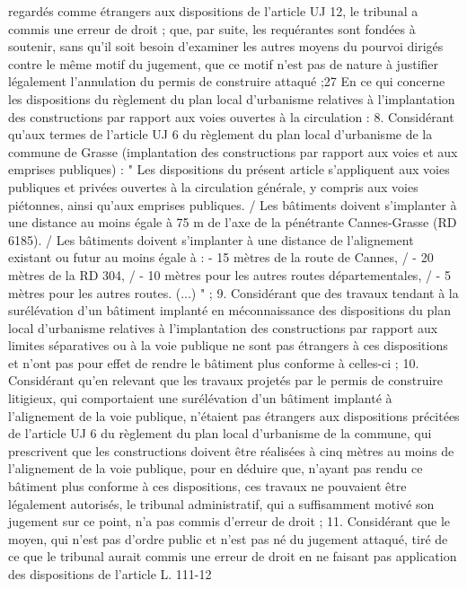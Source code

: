 \documentclass[11pt,a4paper]{report}
\begin{document}
	regardés comme étrangers aux dispositions de l'article UJ 12, le tribunal a commis une erreur de droit ; que,
	par suite, les requérantes sont fondées à soutenir, sans qu'il soit besoin d'examiner les autres moyens du pourvoi
	dirigés contre le même motif du jugement, que ce motif n'est pas de nature à justifier légalement l'annulation du
	permis de construire attaqué ;27
	En ce qui concerne les dispositions du règlement du plan local d'urbanisme relatives à l'implantation des
	constructions par rapport aux voies ouvertes à la circulation :
	8. Considérant qu'aux termes de l'article UJ 6 du règlement du plan local d'urbanisme de la commune de Grasse
	(implantation des constructions par rapport aux voies et aux emprises publiques) : " Les dispositions du présent
	article s'appliquent aux voies publiques et privées ouvertes à la circulation générale, y compris aux voies
	piétonnes, ainsi qu'aux emprises publiques. / Les bâtiments doivent s'implanter à une distance au moins égale à
	75 m de l'axe de la pénétrante Cannes-Grasse (RD 6185). / Les bâtiments doivent s'implanter à une distance de
	l'alignement existant ou futur au moins égale à : - 15 mètres de la route de Cannes, / - 20 mètres de la RD 304, /
	- 10 mètres pour les autres routes départementales, / - 5 mètres pour les autres routes. (...) " ;
	9. Considérant que des travaux tendant à la surélévation d'un bâtiment implanté en méconnaissance des
	dispositions du plan local d'urbanisme relatives à l'implantation des constructions par rapport aux limites
	séparatives ou à la voie publique ne sont pas étrangers à ces dispositions et n'ont pas pour effet de rendre le
	bâtiment plus conforme à celles-ci ;
	10. Considérant qu'en relevant que les travaux projetés par le permis de construire litigieux, qui comportaient
	une surélévation d'un bâtiment implanté à l'alignement de la voie publique, n'étaient pas étrangers aux
	dispositions précitées de l'article UJ 6 du règlement du plan local d'urbanisme de la commune, qui prescrivent
	que les constructions doivent être réalisées à cinq mètres au moins de l'alignement de la voie publique, pour en
	déduire que, n'ayant pas rendu ce bâtiment plus conforme à ces dispositions, ces travaux ne pouvaient être
	légalement autorisés, le tribunal administratif, qui a suffisamment motivé son jugement sur ce point, n'a pas
	commis d'erreur de droit ;
	11. Considérant que le moyen, qui n'est pas d'ordre public et n'est pas né du jugement attaqué, tiré de ce que le
	tribunal aurait commis une erreur de droit en ne faisant pas application des dispositions de l'article L. 111-12
\end{document}
